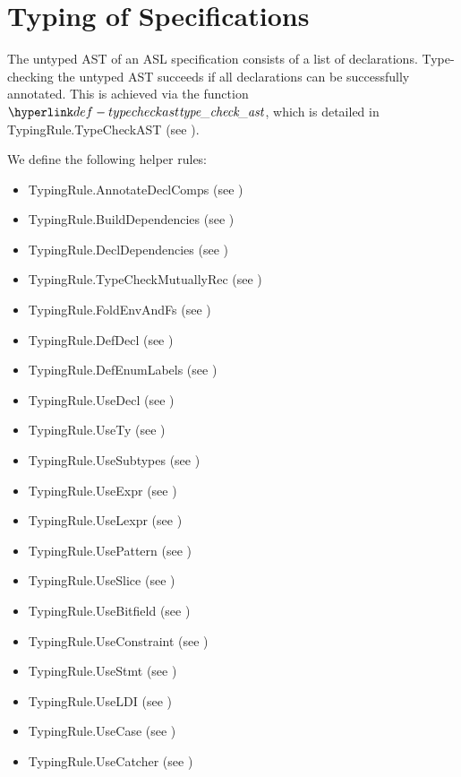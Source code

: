 \chapter{Typing of Specifications}

The untyped AST of an ASL specification consists of a list of declarations.
Type-checking the untyped AST succeeds if all declarations can be successfully annotated.
This is achieved via the function $\typecheckast$, which is detailed in
TypingRule.TypeCheckAST (see ).

We define the following helper rules:
\begin{itemize}
  \item TypingRule.AnnotateDeclComps (see )
  \item TypingRule.BuildDependencies (see )
  \item TypingRule.DeclDependencies (see )
  \item TypingRule.TypeCheckMutuallyRec (see )
  \item TypingRule.FoldEnvAndFs (see )
  \item TypingRule.DefDecl (see )
  \item TypingRule.DefEnumLabels (see )
  \item TypingRule.UseDecl (see )
  \item TypingRule.UseTy (see )
  \item TypingRule.UseSubtypes (see )
  \item TypingRule.UseExpr (see )
  \item TypingRule.UseLexpr (see )
  \item TypingRule.UsePattern (see )
  \item TypingRule.UseSlice (see )
  \item TypingRule.UseBitfield (see )
  \item TypingRule.UseConstraint (see )
  \item TypingRule.UseStmt (see )
  \item TypingRule.UseLDI (see )
  \item TypingRule.UseCase (see )
  \item TypingRule.UseCatcher (see )
\end{itemize}

